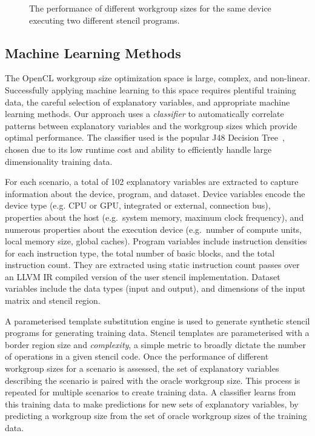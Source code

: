 \documentclass[hidelinks]{acaces}
\begin{document}
\begin{figure}
{\begin{minipage}{.48\textwidth}
\begin{subfigure}[h]{.48\columnwidth}
      \vspace{-1.5em} %
      \caption{}
      \label{fig:motivation-4}
    \end{subfigure}
    \caption{%
      The performance of different workgroup sizes for the same device
      executing two different stencil programs.%
    }
    \label{fig:motivation-prog}
  \end{minipage}%
}
\end{figure}


\subsection{Machine Learning Methods}\label{sec:ml}

The OpenCL workgroup size optimization space is large, complex, and
non-linear. Successfully applying machine learning to this space
requires plentiful training data, the careful selection of explanatory
variables, and appropriate machine learning methods. Our approach uses
a \textit{classifier} to automatically correlate patterns between
explanatory variables and the workgroup sizes which provide optimal
performance. The classifier used is the popular J48 Decision
Tree~\cite{Han2011}, chosen due to its low runtime cost and ability to
efficiently handle large dimensionality training data.

For each scenario, a total of 102 explanatory variables are extracted
to capture information about the device, program, and dataset. Device
variables encode the device type (e.g. CPU or GPU, integrated or
external, connection bus), properties about the host (e.g.\ system
memory, maximum clock frequency), and numerous properties about the
execution device (e.g.\ number of compute units, local memory size,
global caches). Program variables include instruction densities for
each instruction type, the total number of basic blocks, and the total
instruction count. They are extracted using static instruction count
passes over an LLVM IR compiled version of the user stencil
implementation. Dataset variables include the data types (input and
output), and dimensions of the input matrix and stencil region.

A parameterised template substitution engine is used to generate
synthetic stencil programs for generating training data. Stencil
templates are parameterised with a border region size and
\emph{complexity}, a simple metric to broadly dictate the number of
operations in a given stencil code. Once the performance of different
workgroup sizes for a scenario is assessed, the set of explanatory
variables describing the scenario is paired with the oracle workgroup
size. This process is repeated for multiple scenarios to create
training data. A classifier learns from this training data to make
predictions for new sets of explanatory variables, by predicting a
workgroup size from the set of oracle workgroup sizes of the training
data.
\end{document}
